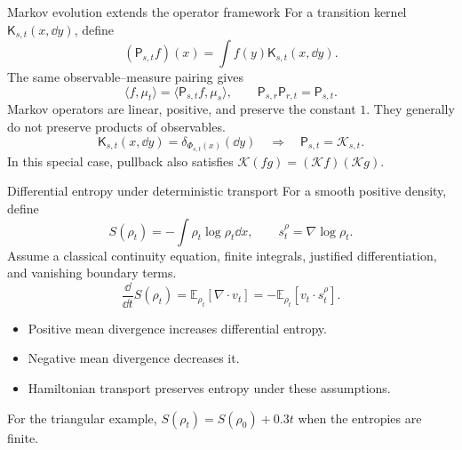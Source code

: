 \begin{frame}[t]{Markov evolution extends the operator framework}
\hypertarget{main:markov}{}
For a transition kernel $\mathsf K_{s,t}(x,\dd y)$, define
\begin{equation*}
  (\mathsf P_{s,t}f)(x)=\int f(y)\mathsf K_{s,t}(x,\dd y).
\end{equation*}
The same observable--measure pairing gives
\begin{equation*}
  \langle f,\mu_t\rangle=\langle\mathsf P_{s,t}f,\mu_s\rangle,\qquad
  \mathsf P_{s,r}\mathsf P_{r,t}=\mathsf P_{s,t}.
\end{equation*}
Markov operators are linear, positive, and preserve the constant $1$.
They generally do not preserve products of observables.
\begin{equation*}
  \mathsf K_{s,t}(x,\dd y)=\delta_{\Phi_{s,t}(x)}(\dd y)
  \quad\Longrightarrow\quad\mathsf P_{s,t}=\mathcal K_{s,t}.
\end{equation*}
In this special case, pullback also satisfies $\mathcal K(fg)=(\mathcal Kf)(\mathcal Kg)$.
\end{frame}

\begin{frame}[t]{Differential entropy under deterministic transport}
\hypertarget{main:entropy}{}
For a smooth positive density, define
\begin{equation*}
  S(\rho_t)=-\int\rho_t\log\rho_t\dd x,\qquad
  s_t^\rho=\nabla\log\rho_t.
\end{equation*}
Assume a classical continuity equation, finite integrals, justified differentiation,
and vanishing boundary terms.
\begin{equation*}
  \boxed{\frac{\dd}{\dd t}S(\rho_t)
  =\mathbb E_{\rho_t}[\nabla\cdot v_t]
  =-\mathbb E_{\rho_t}[v_t\cdot s_t^\rho].}
\end{equation*}
\begin{itemize}\setlength{\itemsep}{6pt}
  \item Positive mean divergence increases differential entropy.
  \item Negative mean divergence decreases it.
  \item Hamiltonian transport preserves entropy under these assumptions.
\end{itemize}
For the triangular example, $S(\rho_t)=S(\rho_0)+0.3t$ when the entropies are finite.
\end{frame}
